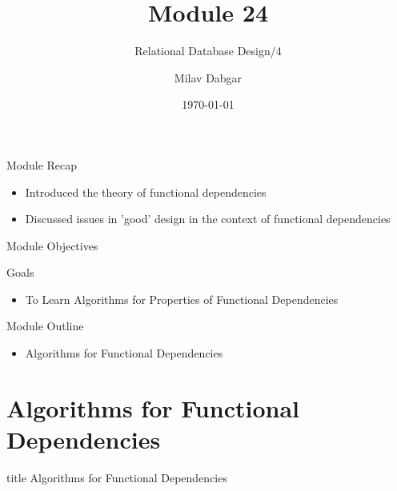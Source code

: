 \documentclass[aspectratio=169, xcolor=dvipsnames]{beamer}
\title{Module 24}
\subtitle{Relational Database Design/4}
\author{Milav Dabgar}
\institute{www.milav.in}
\date{\today}
\begin{document}
\begin{frame}
    \titlepage
\end{frame}

\begin{frame}{Module Recap}
    \begin{itemize}[<+->]
        \item Introduced the theory of functional dependencies
        \item Discussed issues in 'good' design in the context of functional dependencies
    \end{itemize}
\end{frame}

\begin{frame}{Module Objectives}
    \begin{block}{Goals}
        \begin{itemize}[<+->]
            \item To Learn Algorithms for Properties of Functional Dependencies
        \end{itemize}
    \end{block}
\end{frame}

\begin{frame}{Module Outline}
    \begin{itemize}[<+->]
        \item Algorithms for Functional Dependencies
    \end{itemize}
\end{frame}

\section{Algorithms for Functional Dependencies}
\begin{frame}
  \vfill
  \centering
  \begin{beamercolorbox}[sep=8pt,center,shadow=true,rounded=true]{title}
    Algorithms for Functional Dependencies\par%
  \end{beamercolorbox}
  \vfill
\end{frame}
\end{document}
